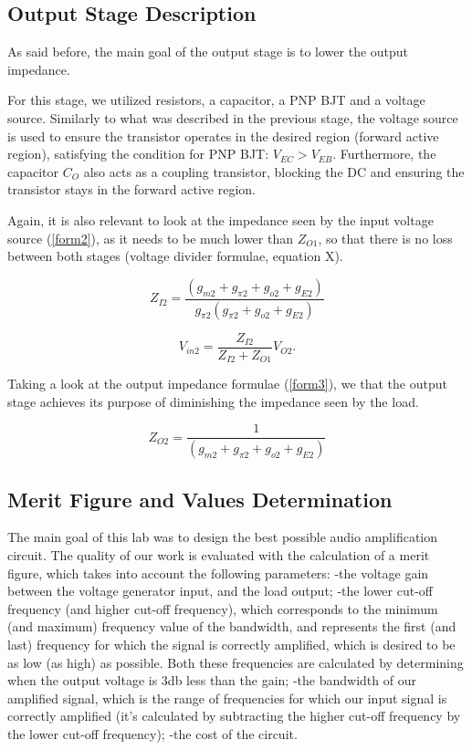\subsection{Output Stage Description}

As said before, the main goal of the output stage is to lower the output impedance.


For this stage, we utilized resistors, a capacitor, a PNP BJT and a voltage source.
Similarly to what was described in the previous stage, the voltage source is used to ensure the transistor operates in the desired region (forward active region), satisfying the condition for PNP BJT: $V_{EC}>V_{EB}$. Furthermore, the capacitor $C_O$ also acts as a coupling transistor, blocking the DC and ensuring the transistor stays in the forward active region.


Again, it is also relevant to look at the impedance seen by the input voltage source (\ref{form2}), as it needs to be much lower than $Z_{O1}$, so that there is no loss between both stages (voltage divider formulae, equation X). 

\begin{equation}
\label{form2}
    Z_{I2}=\frac{(g_{m2}+g_{\pi2}+g_{o2}+g_{E2})}{g_{\pi2}(g_{\pi2}+g_{o2}+g_{E2})}
\end{equation}

\begin{equation}
    V_{in2} = \frac{Z_{I2}}{Z_{I2}+Z_{O1}} V_{O2}. 
\end{equation}


Taking a look at the output impedance formulae (\ref{form3}), we that the output stage achieves its purpose of diminishing the impedance seen by the load.

\begin{equation}
\label{form3}
     Z_{O2}=\frac{1}{(g_{m2}+g_{\pi2}+g_{o2}+g_{E2})}
\end{equation}




\subsection{Merit Figure and Values Determination}

The main goal of this lab was to design the best possible audio amplification circuit. The quality of our work is evaluated with the calculation of a merit figure, which takes into account the following parameters:
-the voltage gain between the voltage generator input, and the load output; 
-the lower cut-off frequency (and higher cut-off frequency), which corresponds to the minimum (and maximum) frequency value of the bandwidth, and represents the first (and last) frequency for which the signal is correctly amplified, which is desired to be as low (as high) as possible. Both these frequencies are calculated by determining when the output voltage is 3db less than the gain;
-the bandwidth of our amplified signal, which is the range of frequencies for which our input signal is correctly amplified (it's calculated by subtracting the higher cut-off frequency by the lower cut-off frequency);
-the cost of the circuit.

